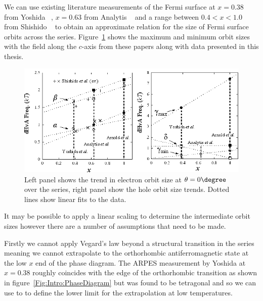 We can use existing literature measurements of the Fermi surface at $x=0.38$ from Yoshida \etal~\cite{Yoshida2010}, $x=0.63$ from Analytis \etal~\cite{Analytis2010c} and a range between $0.4 < x < 1.0$ from Shishido \etal~\cite{Shishido2010} to obtain an approximate relation for the size of Fermi surface orbits across the \BaFeAsP{} series. Figure~\ref{Fig:ResD:SeriesRecipe} shows the maximum and minimum orbit sizes with the field along the $c$-axis from these papers along with data presented in this thesis.
\begin{figure}[htbp]
    \begin{center}
        \includegraphics[scale=1.3]{Chapter-dHvABaFe2P2/Figures/AngleDepMeasurements/SeriesRecipe/SeriesRecipe}
        \caption{Left panel shows the trend in electron orbit size at $\theta=0\degree$ over the series, right panel show the hole orbit size trends. Dotted lines show linear fits to the data.}
        \label{Fig:ResD:SeriesRecipe}
    \end{center}
\end{figure}
It may be possible to apply a linear scaling to determine the intermediate orbit sizes however there are a number of assumptions that need to be made. 

Firstly we cannot apply Vegard's law beyond a structural transition in the series meaning we cannot extrapolate to the orthorhombic antiferromagnetic state at the low $x$ end of the phase diagram. The \ac{ARPES} measurement by Yoshida \etal{} at $x=0.38$ roughly coincides with the edge of the orthorhombic transition as shown in figure~\ref{Fig:Intro:PhaseDiagram} but was found to be tetragonal and so we can use to to define the lower limit for the extrapolation at low temperatures. 


